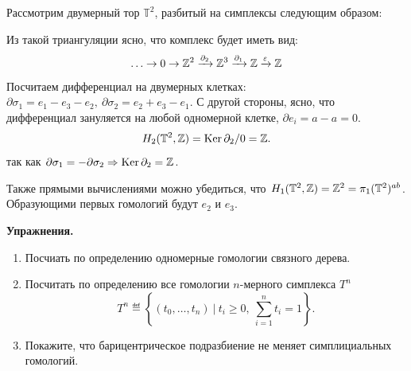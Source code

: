     \begin{example}
        Рассмотрим двумерный тор $\mathbb{T}^2$, разбитый на симплексы следующим образом:
        \begin{center}
        \end{center}
        Из такой триангуляции ясно, что комплекс будет иметь вид:
        \[ \ldots \to 0 \to \mathbb{Z}^2 \xrightarrow{\partial_{2}} \mathbb{Z}^3 \xrightarrow{\partial_{1}} \mathbb{Z} \xrightarrow{\varepsilon} \mathbb{Z} \]
        Посчитаем дифференциал на двумерных клетках: $\partial{\sigma_1} = e_1 - e_3 - e_2, \ \partial{\sigma_{2}} = e_2 + e_3 - e_1$.
        С другой стороны, ясно, что дифференциал зануляется на любой одномерной клетке, $\partial{e_i} = a - a = 0$.
        \[ H_{2}(\mathbb{T}^2,  \mathbb{Z}) = \operatorname{Ker}{\partial_{2}}/0 = \mathbb{Z}. \]
        так как $\partial{\sigma_{1}} = -\partial{\sigma_{2}} \Rightarrow \operatorname{Ker}{\partial_{2}} = \mathbb{Z}$.

        Также прямыми вычислениями можно убедиться, что $H_{1}(\mathbb{T}^2, \mathbb{Z}) = \mathbb{Z}^2 = \pi_1(\mathbb{T}^2)^{ab}$.
        Образующими первых гомологий будут $e_2$ и $e_3$.

        \noindent\bf{Упражнения.}
        \begin{enumerate}
            \item Посчиать по определению одномерные гомологии связного дерева.
            \item Посчитать по определению все гомологии $n$-мерного симплекса $T^n$
                  \[ T^n \eqdef \left\{ (t_0, \ldots, t_n) \ \vert \ t_i \ge 0, \ \sum_{i = 1}^{n} t_i = 1 \right\}.\]
            \item Покажите, что барицентрическое подразбиение не меняет симплициальных гомологий.
        \end{enumerate}

    \end{example}

